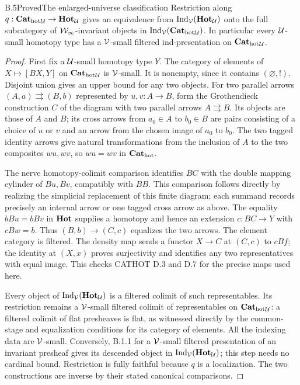 \begin{claim}{B.5}{Proved}{The enlarged-universe classification}
Restriction along $q:{\mathbf{Cat}_{\mathrm{hot}}}_\mathcal U\to\mathbf{Hot}_\mathcal U$ gives an equivalence from $\operatorname{Ind}_\mathcal V(\mathbf{Hot}_\mathcal U)$ onto the full subcategory of $\mathcal W_\infty$-invariant objects in $\operatorname{Ind}_\mathcal V({\mathbf{Cat}_{\mathrm{hot}}}_\mathcal U)$. In particular every $\mathcal U$-small homotopy type has a $\mathcal V$-small filtered ind-presentation on ${\mathbf{Cat}_{\mathrm{hot}}}_\mathcal U$.
\end{claim}
\begin{proof}
First fix a $\mathcal U$-small homotopy type $Y$. The category of elements of $X\mapsto[BX,Y]$ on ${\mathbf{Cat}_{\mathrm{hot}}}_\mathcal U$ is $\mathcal V$-small. It is nonempty, since it contains $(\varnothing,!)$. Disjoint union gives an upper bound for any two objects. For two parallel arrows $(A,a)\rightrightarrows(B,b)$ represented by $u,v:A\to B$, form the Grothendieck construction $C$ of the diagram with two parallel arrows $A\rightrightarrows B$. Its objects are those of $A$ and $B$; its cross arrows from $a_0\in A$ to $b_0\in B$ are pairs consisting of a choice of $u$ or $v$ and an arrow from the chosen image of $a_0$ to $b_0$. The two tagged identity arrows give natural transformations from the inclusion of $A$ to the two composites $wu,wv$, so $wu=wv$ in ${\mathbf{Cat}_{\mathrm{hot}}}$.

The nerve homotopy-colimit comparison identifies $BC$ with the double mapping cylinder of $Bu,Bv$, compatibly with $BB$. This comparison follows directly by realizing the simplicial replacement of this finite diagram; each summand records precisely an internal arrow or one tagged cross arrow as above. The equality $bBu=bBv$ in $\mathbf{Hot}$ supplies a homotopy and hence an extension $c:BC\to Y$ with $cBw=b$. Thus $(B,b)\to(C,c)$ equalizes the two arrows. The element category is filtered. The density map sends a functor $X\to C$ at $(C,c)$ to $cBf$; the identity at $(X,x)$ proves surjectivity and identifies any two representatives with equal image. This checks CATHOT D.3 and D.7 for the precise maps used here.

Every object of $\operatorname{Ind}_\mathcal V(\mathbf{Hot}_\mathcal U)$ is a filtered colimit of such representables. Its restriction remains a $\mathcal V$-small filtered colimit of representables on ${\mathbf{Cat}_{\mathrm{hot}}}_\mathcal U$: a filtered colimit of flat presheaves is flat, as witnessed directly by the common-stage and equalization conditions for its category of elements. All the indexing data are $\mathcal V$-small. Conversely, B.1.1 for a $\mathcal V$-small filtered presentation of an invariant presheaf gives its descended object in $\operatorname{Ind}_\mathcal V(\mathbf{Hot}_\mathcal U)$; this step needs no cardinal bound. Restriction is fully faithful because $q$ is a localization. The two constructions are inverse by their stated canonical comparisons.
\end{proof}
